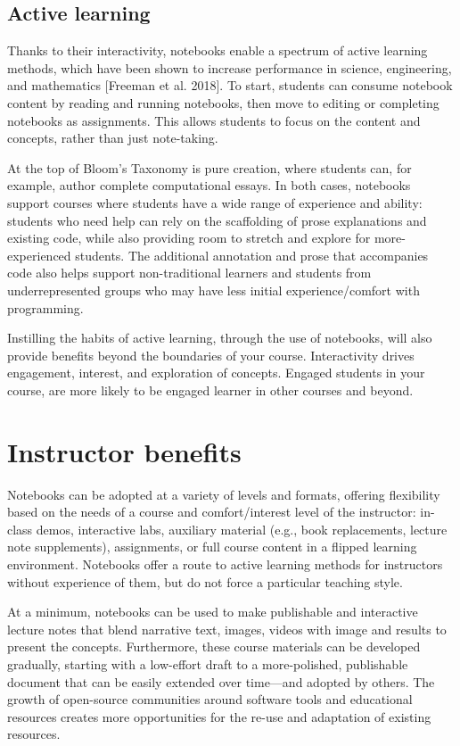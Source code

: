 \documentclass[]{book}
\begin{document}
\subsection{Active learning}\label{active-learning}

Thanks to their interactivity, notebooks enable a spectrum of active
learning methods, which have been shown to increase performance in
science, engineering, and mathematics {[}Freeman et al. 2018{]}. To
start, students can consume notebook content by reading and running
notebooks, then move to editing or completing notebooks as assignments.
This allows students to focus on the content and concepts, rather than
just note-taking.

At the top of Bloom's Taxonomy is pure creation, where students can, for
example, author complete computational essays. In both cases, notebooks
support courses where students have a wide range of experience and
ability: students who need help can rely on the scaffolding of prose
explanations and existing code, while also providing room to stretch and
explore for more-experienced students. The additional annotation and
prose that accompanies code also helps support non-traditional learners
and students from underrepresented groups who may have less initial
experience/comfort with programming.

Instilling the habits of active learning, through the use of notebooks,
will also provide benefits beyond the boundaries of your course.
Interactivity drives engagement, interest, and exploration of concepts.
Engaged students in your course, are more likely to be engaged learner
in other courses and beyond.

\section{Instructor benefits}\label{instructor-benefits}

Notebooks can be adopted at a variety of levels and formats, offering
flexibility based on the needs of a course and comfort/interest level of
the instructor: in-class demos, interactive labs, auxiliary material
(e.g., book replacements, lecture note supplements), assignments, or
full course content in a flipped learning environment. Notebooks offer a
route to active learning methods for instructors without experience of
them, but do not force a particular teaching style.

At a minimum, notebooks can be used to make publishable and interactive
lecture notes that blend narrative text, images, videos with image and
results to present the concepts. Furthermore, these course materials can
be developed gradually, starting with a low-effort draft to a
more-polished, publishable document that can be easily extended over
time---and adopted by others. The growth of open-source communities
around software tools and educational resources creates more
opportunities for the re-use and adaptation of existing resources.
\end{document}
